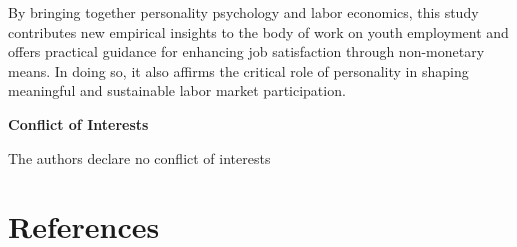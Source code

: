 \documentclass[
]{interact}
\begin{document}
By bringing together personality psychology and labor economics, this
study contributes new empirical insights to the body of work on youth
employment and offers practical guidance for enhancing job satisfaction
through non-monetary means. In doing so, it also affirms the critical
role of personality in shaping meaningful and sustainable labor market
participation.

\textbf{Conflict of Interests}

The authors declare no conflict of interests

\section*{References}\label{references}

\label{refs}
\end{document}
